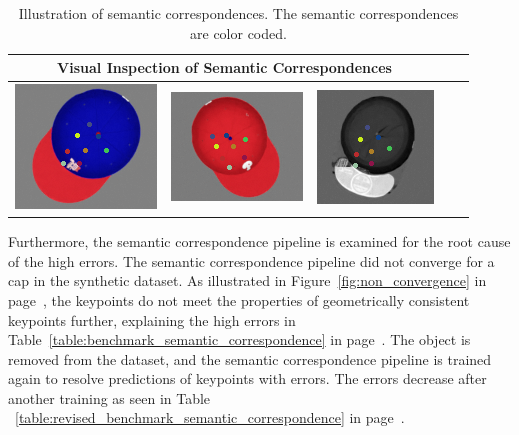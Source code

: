 \begin{table}[htb]
    \centering
    \begin{tabular}{lcccc}
        \hline
        \multicolumn{3}{c}{Visual Inspection of Semantic Correspondences}                                                                                                                                                           \\ \hline
        \multicolumn{1}{c}{\includegraphics[scale=0.87]{images/cap/image_a.png}} & \multicolumn{1}{c}{\includegraphics[scale=1]{images/cap/image_b.png}} & \multicolumn{1}{c}{\includegraphics[scale=0.95]{images/cap/image_c.png}} \\ \hline
    \end{tabular}
    \caption{Illustration of semantic correspondences. The semantic correspondences are color coded.}
    \label{table:visual_inspection_semantic_correspondence}
\end{table}

Furthermore, the semantic correspondence pipeline is examined for the root cause of the high errors.
The semantic correspondence pipeline did not converge for a cap in the synthetic dataset.
As illustrated in Figure~\ref{fig:non_convergence} in page~\pageref{fig:non_convergence}, the keypoints do not meet
the properties of geometrically consistent keypoints further, explaining the high errors in Table~\ref{table:benchmark_semantic_correspondence}
in page~\pageref{table:benchmark_semantic_correspondence}. The object is removed from the dataset, and the
semantic correspondence pipeline is trained again to resolve predictions of keypoints with errors.
The errors decrease after another training as seen in Table ~\ref{table:revised_benchmark_semantic_correspondence} in page~\pageref{table:revised_benchmark_semantic_correspondence}.

